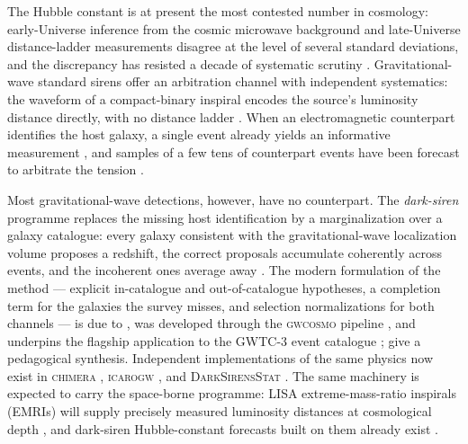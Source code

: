 The Hubble constant is at present the most contested number in
cosmology: early-Universe inference from the cosmic microwave
background \citep{Planck:2018vyg} and late-Universe distance-ladder
measurements \citep{Riess:2021jrx} disagree at the level of several
standard deviations, and the discrepancy has resisted a decade of
systematic scrutiny \citep{DiValentino:2021izs}.
Gravitational-wave standard sirens offer an arbitration channel with
independent systematics: the waveform of a compact-binary inspiral
encodes the source's luminosity distance directly, with no distance
ladder \citep{Schutz:1986gp}.  When an electromagnetic counterpart
identifies the host galaxy, a single event already yields an
informative measurement \citep{Abbott:2017xzu}, and samples of a few
tens of counterpart events have been forecast to arbitrate the
tension \citep{Chen:2017rfc}.

Most gravitational-wave detections, however, have no counterpart.
The \emph{dark-siren} programme replaces the missing host
identification by a marginalization over a galaxy catalogue: every
galaxy consistent with the gravitational-wave localization volume
proposes a redshift, the correct proposals accumulate coherently
across events, and the incoherent ones average away
\citep{Schutz:1986gp,DelPozzo:2011vcw}.
The modern formulation of the method --- explicit in-catalogue and
out-of-catalogue hypotheses, a completion term for the galaxies the
survey misses, and selection normalizations for both channels --- is
due to \citet{Gray:2019ksv}, was developed through the
\textsc{gwcosmo} pipeline
\citep{Gray:2021sew,Gray:2023wgj},
and underpins the flagship application to the GWTC-3 event catalogue
\citep{LIGOScientific:2021aug};
\citet{Gair:2022zsa} give a pedagogical synthesis.  Independent
implementations of the same physics now exist in \textsc{chimera}
\citep{Borghi:2023opd}, \textsc{icarogw}
\citep{Mastrogiovanni:2023zbw}, and
\textsc{DarkSirensStat} \citep{Finke:2021aom}.
The same machinery is expected to carry the space-borne programme:
LISA extreme-mass-ratio inspirals (EMRIs) will supply precisely
measured luminosity distances at cosmological depth
\citep{Babak:2017tow,LISA:2024hlh}, and dark-siren Hubble-constant
forecasts built on them already exist \citep{Laghi:2021pqk}.

